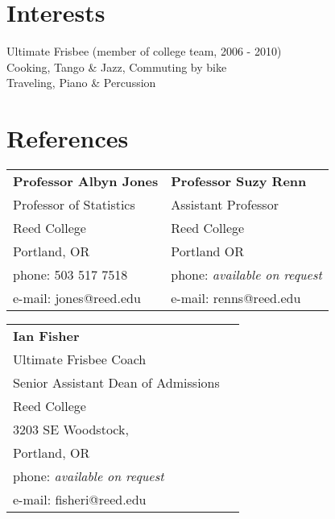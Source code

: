 \documentclass[margin,line]{resume}
\begin{document}
\begin{resume}
\newpage
    \section{\mysidestyle Interests} 

Ultimate Frisbee (member of college team, 2006 - 2010) \\
Cooking, Tango \& Jazz, Commuting by bike \\
Traveling, Piano \& Percussion \\







\section{\mysidestyle References} 

\begin{tabular}{@{}p{6cm}p{6cm}}
\textbf{Professor Albyn Jones}       &  \textbf{Professor Suzy Renn}                   \\
Professor of Statistics                              &  Assistant Professor                       \\
Reed College                     &  Reed College                 \\
Portland, OR           &  Portland OR        \\
phone: 503 517 7518    &  phone: \textsl{available on request}     \\
e-mail: jones@reed.edu   &  e-mail: renns@reed.edu    \\
\end{tabular}

\begin{tabular}{@{}p{6cm}p{6cm}}
\textbf{Ian Fisher}     \\
Ultimate Frisbee Coach \\ Senior Assistant Dean of Admissions                    \\
Reed College \\
3203 SE Woodstock, \\ Portland, OR     \\  
phone: \textsl{available on request} \\   
e-mail: fisheri@reed.edu \\ 
\end{tabular}



\end{resume}
\end{document}
